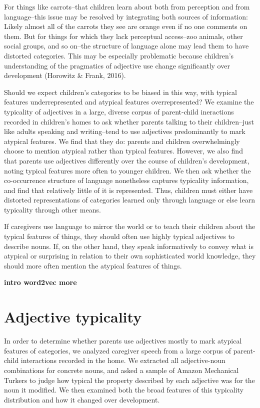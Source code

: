 \documentclass[10pt, letterpaper]{article}
\begin{document}
For things like carrots--that children learn about both from perception
and from language--this issue may be resolved by integrating both
sources of information: Likely almost all of the carrots they see are
orange even if no one comments on them. But for things for which they
lack perceptual access--zoo animals, other social groups, and so on--the
structure of language alone may lead them to have distorted categories.
This may be especially problematic because children's understanding of
the pragmatics of adjective use change significantly over development
(Horowitz \& Frank, 2016).

Should we expect children's categories to be biased in this way, with
typical features underrepresented and atypical features overrepresented?
We examine the typicality of adjectives in a large, diverse corpus of
parent-child ineractions recorded in children's homes to ask whether
parents talking to their children--just like adults speaking and
writing--tend to use adjectives predominantly to mark atypical features.
We find that they do: parents and children overwhelmingly choose to
mention atypical rather than typical features. However, we also find
that parents use adjectives differently over the course of children's
development, noting typical features more often to younger children. We
then ask whether the co-occurrence structure of language nonetheless
captures typicality information, and find that relatively little of it
is represented. Thus, children must either have distorted
representations of categories learned only through language or else
learn typicality through other means.

If caregivers use language to mirror the world or to teach their
children about the typical features of things, they should often use
highly typical adjectives to describe nouns. If, on the other hand, they
speak informatively to convey what is atypical or surprising in relation
to their own sophisticated world knowledge, they should more often
mention the atypical features of things.

\textbf{intro word2vec more}

\hypertarget{adjective-typicality}{%
\section{Adjective typicality}\label{adjective-typicality}}

In order to determine whether parents use adjectives mostly to mark
atypical features of categories, we analyzed caregiver speech from a
large corpus of parent-child interactions recorded in the home. We
extracted all adjective-noun combinations for concrete nouns, and asked
a sample of Amazon Mechanical Turkers to judge how typical the property
described by each adjective was for the noun it modified. We then
examined both the broad features of this typicality distribution and how
it changed over development.
\end{document}
